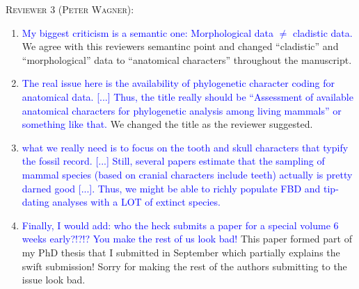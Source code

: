 \documentclass[12pt,letterpaper]{article}
\renewcommand{\section}[1]{%
\bigskip
\begin{center}
\begin{Large}
\normalfont\scshape #1
\medskip
\end{Large}
\end{center}}
\begin{document}
\section{Reviewer 3 (Peter Wagner):}
\begin{enumerate}
\item{\textcolor{blue}{My biggest criticism is a semantic one: Morphological data $\neq$ cladistic data.}}
We agree with this reviewers semantinc point and changed ``cladistic'' and ``morphological'' data to ``anatomical characters'' throughout the manuscript.

\item{\textcolor{blue}{The real issue here is the availability of phylogenetic character coding for anatomical data.
[...] Thus, the title really should be ``Assessment of available anatomical characters for phylogenetic analysis among living mammals'' or something like that.}}
We changed the title as the reviewer suggested.

\item{\textcolor{blue}{what we really need is to focus on the tooth and skull characters that typify the fossil record.
[...] Still, several papers estimate that the sampling of mammal species (based on cranial characters include teeth) actually is pretty darned good [...].
Thus, we might be able to richly populate FBD and tip-dating analyses with a LOT of extinct species.}}


\item{\textcolor{blue}{Finally, I would add: who the heck submits a paper for a special volume 6 weeks early?!?!? You make the rest of us look bad!}}
This paper formed part of my PhD thesis that I submitted in September which partially explains the swift submission!
Sorry for making the rest of the authors submitting to the issue look bad.

\end{enumerate}
\end{document}
